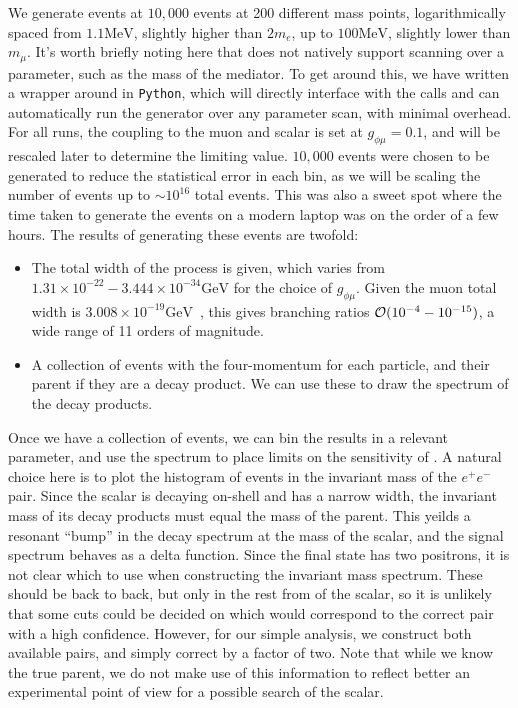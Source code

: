 We generate events at $10,000$ events at 200 different mass points, logarithmically spaced from $1.1\textrm{MeV}$, slightly higher than $2m_e$, up to $100\textrm{MeV}$, slightly lower than $m_\mu$.
It's worth briefly noting here that \madgraph does not natively support scanning over a parameter, such as the mass of the mediator.
To get around this, we have written a wrapper around \madgraph in \texttt{Python}, which will directly interface with the \madgraph calls and can automatically run the generator over any parameter scan, with minimal overhead.
For all runs, the coupling to the muon and scalar is set at $g_{\phi\mu} = 0.1$, and will be rescaled later to determine the limiting value.
$10,000$ events were chosen to be generated to reduce the statistical error in each bin, as we will be scaling the number of events up to $\sim 10^{16}$ total events.
This was also a sweet spot where the time taken to generate the events on a modern laptop was on the order of a few hours.
The results of generating these events are twofold:
\begin{itemize}
    \item{The total width of the process is given, which varies from $1.31\times 10^{-22} - 3.444\times 10^{-34}\textrm{GeV}$ for the choice of $g_{\phi\mu}$. Given the muon total width is $3.008 \times 10^{-19}\textrm{GeV}$~\cite{Agashe:2014kda}, this gives branching ratios $\operatorname{\mathcal{O}}(10^{-4} - 10^{-15})$, a wide range of 11 orders of magnitude.}
    \item{A collection of events with the four-momentum for each particle, and their parent if they are a decay product. We can use these to draw the spectrum of the decay products.}
\end{itemize}

Once we have a collection of events, we can bin the results in a relevant parameter, and use the spectrum to place limits on the sensitivity of \mueee.
A natural choice here is to plot the histogram of events in the invariant mass of the $e^+ e^-$ pair.
Since the scalar is decaying on-shell and has a narrow width, the invariant mass of its decay products must equal the mass of the parent.
This yeilds a resonant ``bump'' in the decay spectrum at the mass of the scalar, and the signal spectrum behaves as a delta function.
Since the final state has two positrons, it is not clear which to use when constructing the invariant mass spectrum.
These should be back to back, but only in the rest from of the scalar, so it is unlikely that some cuts could be decided on which would correspond to the correct pair with a high confidence.
However, for our simple analysis, we construct both available pairs, and simply correct by a factor of two.
Note that while we know the true parent, we do not make use of this information to reflect better an experimental point of view for a possible search of the scalar.

